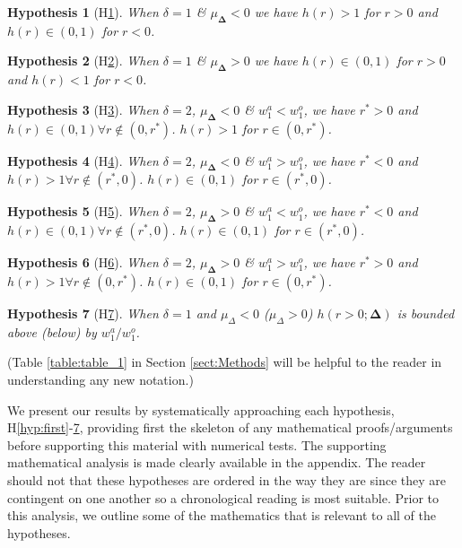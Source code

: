 \documentclass[10pt,journal,compsoc]{IEEEtran}
\makeatletter
\newtheorem{hyp}{Hypothesis}
\newcounter{subhyp}
\newenvironment{subhyp}
 {%
  \setcounter{subhyp}{0}%
  \stepcounter{hyp}%
  \edef\saved@hyp{\thehyp}%
  \let\c@hyp\c@subhyp     %
  \renewcommand{\thehyp}{\saved@hyp\alph{hyp}}%
 }
 {}
\makeatother
\begin{document}
\begin{subhyp}
\begin{hyp}[H\ref{hyp:thirda}]
\label{hyp:thirda}
When $\delta = 1$ \& $\mu_{\boldsymbol{\Delta}}<0$ we have $h(r)>1$ for $r>0$ and $h(r) \in (0,1)$ for $r<0$.
\end{hyp}
\begin{hyp}[H\ref{hyp:thirdb}]
\label{hyp:thirdb}
When $\delta = 1$ \& $\mu_{\boldsymbol{\Delta}}>0$ we have $h(r) \in (0, 1)$ for $r>0$ and $h(r)<1$ for $r<0$.
\end{hyp}
\begin{hyp}[H\ref{hyp:thirdc}]
\label{hyp:thirdc}
When $\delta = 2$, $\mu_{\boldsymbol{\Delta}}<0$ \& $w_1^a<w_1^o$, we have $r^*>0$ and $h(r) \in (0,1) \forall r \notin (0, r^*)$. $h(r)>1$ for $r \in (0, r^*)$.
\end{hyp}
\begin{hyp}[H\ref{hyp:thirdd}]
\label{hyp:thirdd}
When $\delta = 2$, $\mu_{\boldsymbol{\Delta}}<0$ \& $w_1^a>w_1^o$, we have $r^*<0$ and $h(r)>1 \forall r \notin (r^*, 0)$. $h(r) \in (0,1)$ for $r \in (r^*, 0)$.
\end{hyp}
\begin{hyp}[H\ref{hyp:thirde}]
\label{hyp:thirde}
When $\delta = 2$, $\mu_{\boldsymbol{\Delta}}>0$ \& $w_1^a<w_1^o$, we have $r^*<0$ and $h(r) \in (0,1) \forall r \notin (r^*, 0)$. $h(r) \in (0,1)$ for $r \in (r^*, 0)$.
\end{hyp}
\begin{hyp}[H\ref{hyp:thirdf}]
\label{hyp:thirdf}
When $\delta = 2$, $\mu_{\boldsymbol{\Delta}}>0$ \& $w_1^a>w_1^o$, we have $r^*>0$ and $h(r) >1 \forall r \notin (0, r^*)$. $h(r)\in (0,1)$ for $r \in (0, r^*)$.
\end{hyp}
\end{subhyp}
\begin{hyp}[H\ref{hyp:fourth}]
\label{hyp:fourth}
When $\delta=1$ and $\mu_{\Delta}<0$ ($\mu_{\Delta}>0$) $h(r>0; \boldsymbol{\Delta})$ is bounded above (below) by $w_1^a/w_1^o$. 
\end{hyp}

(Table \ref{table:table_1}  in Section \ref{sect:Methods} will be helpful to the reader in understanding any new notation.)

We present our results by systematically approaching each hypothesis, H\ref{hyp:first}-\ref{hyp:fourth}, providing first the skeleton of any mathematical proofs/arguments before supporting this material with numerical tests. The supporting mathematical analysis is made clearly available in the appendix. The reader should not that these hypotheses are ordered in the way they are since they are contingent on one another so a chronological reading is most suitable. Prior to this analysis, we outline some of the mathematics that is relevant to all of the hypotheses.\\
\end{document}
